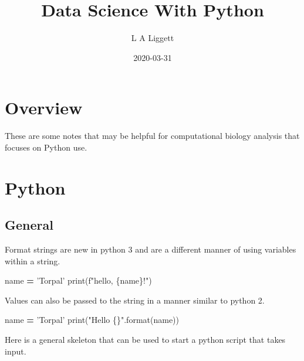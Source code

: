 \documentclass[]{book}
\title{Data Science With Python}
\author{L A Liggett}
\date{2020-03-31}
\newenvironment{Shaded}{\begin{snugshade}}{\end{snugshade}}
\newcommand{\BuiltInTok}[1]{#1}
\newcommand{\NormalTok}[1]{#1}
\newcommand{\OperatorTok}[1]{\textcolor[rgb]{0.81,0.36,0.00}{\textbf{#1}}}
\newcommand{\SpecialCharTok}[1]{\textcolor[rgb]{0.00,0.00,0.00}{#1}}
\newcommand{\SpecialStringTok}[1]{\textcolor[rgb]{0.31,0.60,0.02}{#1}}
\newcommand{\StringTok}[1]{\textcolor[rgb]{0.31,0.60,0.02}{#1}}
\begin{document}
\maketitle

{
\setcounter{tocdepth}{1}
\tableofcontents
}
\hypertarget{overview}{%
\chapter{Overview}\label{overview}}

These are some notes that may be helpful for computational biology analysis that focuses on Python use.

\hypertarget{python}{%
\chapter{Python}\label{python}}

\hypertarget{general}{%
\section{General}\label{general}}

Format strings are new in python 3 and are a different manner of using variables within a string.

\begin{Shaded}
\begin{Highlighting}[]
\NormalTok{name }\OperatorTok{=} \StringTok{'Torpal'}
\BuiltInTok{print}\NormalTok{(}\SpecialStringTok{f"hello, }\SpecialCharTok{\{}\NormalTok{name}\SpecialCharTok{\}}\SpecialStringTok{!"}\NormalTok{)}
\end{Highlighting}
\end{Shaded}

Values can also be passed to the string in a manner similar to python 2.

\begin{Shaded}
\begin{Highlighting}[]
\NormalTok{name }\OperatorTok{=} \StringTok{'Torpal'}
\BuiltInTok{print}\NormalTok{(}\StringTok{"Hello }\SpecialCharTok{\{\}}\StringTok{"}\NormalTok{.}\BuiltInTok{format}\NormalTok{(name))}
\end{Highlighting}
\end{Shaded}

Here is a general skeleton that can be used to start a python script that takes input.
\end{document}
